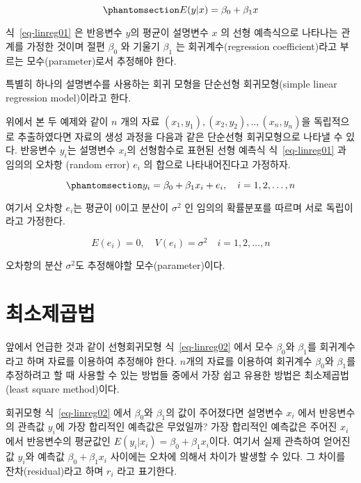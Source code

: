\documentclass[
  11pt,
  a4paper,
  oneside]{scrbook}
\theoremstyle{definition}
\theoremstyle{plain}
\theoremstyle{definition}
\theoremstyle{definition}
\theoremstyle{remark}
\begin{document}
\begin{equation}\phantomsection\label{eq-linreg01}{
E(y|x) = \beta_0 + \beta_1 x
}\end{equation}

식~\ref{eq-linreg01} 은 반응변수 \(y\)의 평균이 설명변수 \(x\) 의 선형
예측식으로 나타나는 관계를 가정한 것이며 절편 \(\beta_0\) 와 기울기
\(\beta_1\) 는 회귀계수(regression coefficient)라고 부르는
모수(parameter)로서 추정해야 한다.

특별히 하나의 설명변수를 사용하는 회귀 모형을 단순선형 회귀모형(simple
linear regression model)이라고 한다.

위에서 본 두 예제와 같이 \(n\) 개의 자료
\((x_1,y_1),(x_2,y_2),..,(x_n, y_n)\)을 독립적으로 추출하였다면 자료의
생성 과정을 다음과 같은 단순선형 회귀모형으로 나타낼 수 있다. 반응변수
\(y_i\)는 설명변수 \(x_i\)의 선형함수로 표현된 선형 예측식
식~\ref{eq-linreg01} 과 임의의 오차항 (random error) \(e_i\) 의 합으로
나타내어진다고 가정하자.

\begin{equation}\phantomsection\label{eq-linreg02}{
y_i = \beta_0 + \beta_1 x_i + e_i, \quad i=1,2,\dots,n
}\end{equation}

여기서 오차항 \(e_i\)는 평균이 \(0\)이고 분산이 \(\sigma^2\) 인 임의의
확률분포를 따르며 서로 독립이라고 가정한다.

\[ E(e_i)=0, \quad V(e_i) = \sigma^2 \quad i=1,2,\dots,n \]

오차항의 분산 \(\sigma^2\)도 추정해야할 모수(parameter)이다.

\section{최소제곱법}\label{uxcd5cuxc18cuxc81cuxacf1uxbc95}

앞에서 언급한 것과 같이 선형회귀모형 식~\ref{eq-linreg02} 에서 모수
\(\beta_0\)와 \(\beta_1\)를 회귀계수라고 하며 자료를 이용하여 추정해야
한다. \(n\)개의 자료를 이용하여 회귀계수 \(\beta_0\)와 \(\beta_1\)를
추정하려고 할 때 사용할 수 있는 방법들 중에서 가장 쉽고 유용한 방법은
최소제곱법(least square method)이다.

회귀모형 식~\ref{eq-linreg02} 에서 \(\beta_0\)와 \(\beta_1\)의 값이
주어졌다면 설명변수 \(x_i\) 에서 반응변수의 관측값 \(y_i\)에 가장
합리적인 예측값은 무었일까? 가장 합리적인 예측값은 주어진 \(x_i\)에서
반응변수의 평균값인 \(E(y_i | x_i)=\beta_0 + \beta_1 x_i\)이다. 여기서
실제 관측하여 얻어진 값 \(y_i\)와 예측값 \(\beta_0 + \beta_1 x_i\)
사이에는 오차에 의해서 차이가 발생할 수 있다. 그 차이를
잔차(residual)라고 하며 \(r_i\) 라고 표기한다.
\end{document}
